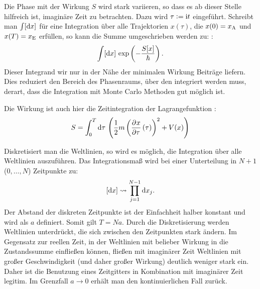 Die Phase mit der Wirkung $S$ wird stark variieren, so dass es ab dieser Stelle
hilfreich ist, imaginäre Zeit zu betrachten. Dazu wird $\tau := \mathrm i t$
eingeführt. Schreibt man $\int [\dif x]$ für eine Integration über alle
Trajektorien $x(\tau)$, die $x(0) = x_\text A$ und $x(T) = x_\text E$ erfüllen,
so kann die Summe umgeschrieben werden zu:
\parencite[(2.1)]{Creutz/Statistical_Approach_QM}:
\[
    \int [\dif x] \, \exp\del{-\frac{S[x]}\hbar}.
\]
Dieser Integrand wir nur in der Nähe der minimalen Wirkung Beiträge liefern.
Dies reduziert den Bereich des Phasenraums, über den integriert werden muss,
derart, dass die Integration mit Monte Carlo Methoden gut möglich ist.

Die Wirkung ist auch hier die Zeitintegration der Lagrangefunktion
\parencite[(2.5)]{Creutz/Statistical_Approach_QM}:
\[
    S = \int_0^T \dif \tau \, \del{\frac 12 m \del{\dpd x\tau(\tau)}^2 + V(x)}
\]

Diskretisiert man die Weltlinien, so wird es möglich, die Integration über alle
Weltlinien auszuführen. Das Integrationsmaß wird bei einer Unterteilung in
$N+1$ ($0, \ldots, N$)
Zeitpunkte zu:
\[
    [\dif x] \leadsto \prod_{j = 1}^{N-1} \dif x_j.
\]
Der Abstand der diskreten Zeitpunkte ist der Einfachheit halber konstant und
wird als $a$ definiert. Somit gilt $T = Na$. Durch die Diskretisierung werden
Weltlinien unterdrückt, die sich zwischen den Zeitpunkten stark ändern. Im
Gegensatz zur reellen Zeit, in der Weltlinien mit belieber Wirkung in die
Zustandssumme einfließen können, fließen mit imaginärer Zeit Weltlinien mit
großer Geschwindigkeit (und daher großer Wirkung) deutlich weniger stark ein.
Daher ist die Benutzung eines Zeitgitters in Kombination mit imaginärer Zeit
legitim. Im Grenzfall $a \to 0$ erhält man den kontinuierlichen Fall zurück.





